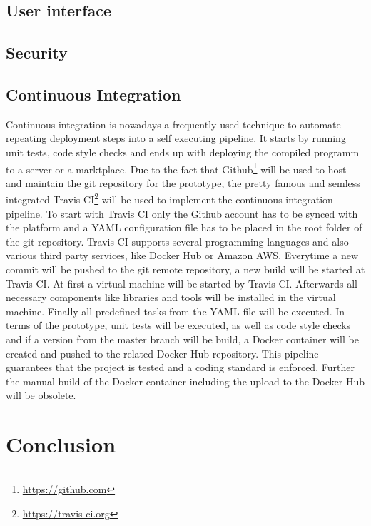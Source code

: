 
\subsection{User interface}
\doit

\subsection{Security}
\doit

\subsection{Continuous Integration}
Continuous integration is nowadays a frequently used technique to automate repeating deployment steps into a self executing pipeline.
It starts by running unit tests, code style checks and ends up with deploying the compiled programm to a server or a marktplace.
Due to the fact that Github\footnote{\url{https://github.com}} will be used to host and maintain the git repository for the prototype, the pretty famous and semless integrated Travis CI\footnote{\url{https://travis-ci.org}} will be used to implement the continuous integration pipeline.
To start with Travis CI only the Github account has to be synced with the platform and a \ac{YAML} configuration file has to be placed in the root folder of the git repository.
Travis CI supports several programming languages and also various third party services, like Docker Hub or Amazon AWS.
Everytime a new commit will be pushed to the git remote repository, a new build will be started at Travis CI.
At first a virtual machine will be started by Travis CI.
Afterwards all necessary components like libraries and tools will be installed in the virtual machine.
Finally all predefined tasks from the \ac{YAML} file will be executed.
In terms of the prototype, unit tests will be executed, as well as code style checks and if a version from the master branch will be build, a Docker container will be created and pushed to the related Docker Hub repository.
This pipeline guarantees that the project is tested and a coding standard is enforced.
Further the manual build of the Docker container including the upload to the Docker Hub will be obsolete.

\section{Conclusion}
\doit



